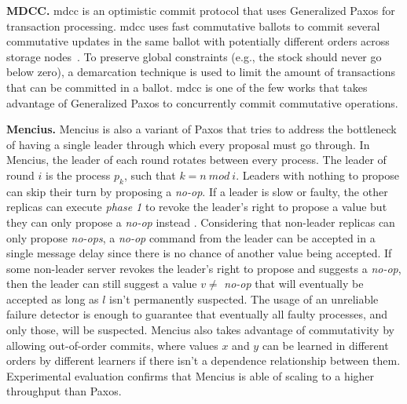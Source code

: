 \textbf{MDCC.} \acrfull{mdcc} is an optimistic commit protocol that uses Generalized Paxos for transaction processing. \acrshort{mdcc} uses fast commutative ballots to commit several commutative updates in the same ballot with potentially different orders across storage nodes~\cite{Kraska2013}. To preserve global constraints (e.g., the stock should never go below zero), a demarcation technique is used to limit the amount of transactions that can be committed in a ballot. \acrshort{mdcc} is one of the few works that takes advantage of Generalized Paxos to concurrently commit commutative operations.\par
\textbf{Mencius.} Mencius is also a variant of Paxos that tries to address the bottleneck of having a single leader through which every proposal must go through. In Mencius, the leader of each round rotates between every process. The leader of round $i$ is the process $p_k$, such that $k = n\ mod\ i$.  Leaders with nothing to propose can skip their turn by proposing a \textit{no-op}. If a leader is slow or faulty, the other replicas can execute \textit{phase 1} to revoke the leader's right to propose a value but they can only propose a \textit{no-op} instead \cite{Mao2008}. Considering that non-leader replicas can only propose \textit{no-ops}, a \textit{no-op} command from the leader can be accepted in a single message delay since there is no chance of another value being accepted. If some non-leader server revokes the leader's right to propose and suggests a \textit{no-op}, then the leader can still suggest a value $v \neq$ \textit{no-op} that will eventually be accepted as long as $l$ isn't permanently suspected. The usage of an unreliable failure detector is enough to guarantee that eventually all faulty processes, and only those, will be suspected. Mencius also takes advantage of commutativity by allowing out-of-order commits, where values $x$ and $y$ can be learned in different orders by different learners if there isn't a dependence relationship between them. Experimental evaluation confirms that Mencius is able of scaling to a higher throughput than Paxos. \par
